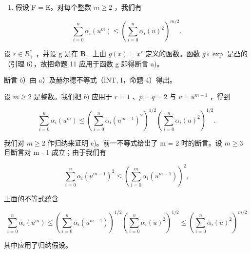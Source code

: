 \begin{enumerate}
\def\labelenumi{\alph{enumi})}
\setcounter{enumi}{2}
\tightlist
\item
  假设 F = E。对每个整数 \(m \geqslant 2\) ，我们有
\end{enumerate}

\[
\sum_ {i = 0} ^ {n} \alpha_ {i} (u ^ {m}) \leqslant \left(\sum_ {i = 0} ^ {n} \alpha_ {i} (u) ^ {2}\right) ^ {m / 2}.
\]

设 \(r \in R_{+}^{*}\) ，并设 g 是在 \(\mathbf{R}_{+}\) 上由 \(g(x) = x^{r}\) 定义的函数。函数 \(g \circ \exp\) 是凸的（引理 6），故把命题 11 应用于函数 g 即得断言 a)。

断言 \(b\)）由 \(a\)）及赫尔德不等式（INT, I，命题 4）得出。

设 \(m \geqslant 2\) 是整数。我们把 \(b)\) 应用于 \(r = 1\) 、\(p = q = 2\) 与 \(v = u^{m-1}\) ，得到

\[
\sum_ {i = 0} ^ {n} \alpha_ {i} (u ^ {m}) \leqslant \left(\sum_ {i = 0} ^ {n} \alpha_ {i} (u ^ {m - 1}) ^ {2}\right) ^ {1 / 2} \left(\sum_ {i = 0} ^ {n} \alpha_ {i} (u) ^ {2}\right) ^ {1 / 2}.
\]

我们对 \(m \geqslant 2\) 作归纳来证明 c)。前一不等式给出了 m = 2 时的断言。设 \(m \geqslant 3\) 且断言对 m - 1 成立；由于我们有

\[
\sum_ {i = 0} ^ {n} \alpha_ {i} (u ^ {m - 1}) ^ {2} \leqslant \left(\sum_ {i = 0} ^ {m} \alpha_ {i} (u ^ {m - 1})\right) ^ {2},
\]

上面的不等式蕴含

\[
\sum_ {i = 0} ^ {n} \alpha_ {i} (u ^ {m}) \leqslant \left(\sum_ {i = 0} ^ {n} \alpha_ {i} (u ^ {m - 1})\right) ^ {1 / 2} \left(\sum_ {i = 0} ^ {n} \alpha_ {i} (u) ^ {2}\right) ^ {1 / 2} \leqslant \left(\sum_ {i = 0} ^ {n} \alpha_ {i} (u) ^ {2}\right) ^ {m / 2}
\]

其中应用了归纳假设。

